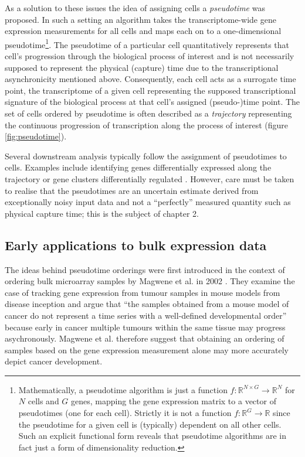 As a solution to these issues the idea of assigning cells a \emph{pseudotime} was proposed. In such a setting an algorithm takes the transcriptome-wide gene expression measurements for all cells and maps each on to a one-dimensional pseudotime\footnote{Mathematically, a pseudotime algorithm is just a function $f: \mathbb{R}^{N\times G} \rightarrow \mathbb{R}^N$ for $N$ cells and $G$ genes, mapping the gene expression matrix to a vector of pseudotimes (one for each cell). Strictly it is not a function $f: \mathbb{R}^G \rightarrow \mathbb{R}$ since the pseudotime for a given cell is (typically) dependent on all other cells. Such an explicit functional form reveals that pseudotime algorithms are in fact just a form of dimensionality reduction.}.
The pseudotime of a particular cell quantitatively represents that cell's progression through the biological process of interest and is not necessarily supposed to represent the physical (capture) time due to the transcriptional asynchronicity mentioned above. Consequently, each cell acts as a surrogate time point, the transcriptome of a given cell representing the supposed transcriptional signature of the biological process at that cell's assigned (pseudo-)time point. The set of cells ordered by pseudotime is often described as a \emph{trajectory} representing the continuous progression of transcription along the process of interest (figure \ref{fig:pseudotime}).

Several downstream analysis typically follow the assignment of pseudotimes to cells. Examples include identifying genes differentially expressed along the trajectory \cite{campbell2016switchde} or gene clusters differentially regulated \cite{Trapnell2014-xi}. However, care must be taken to realise that the pseudotimes are an uncertain estimate derived from exceptionally noisy input data and not a ``perfectly'' measured quantity such as physical capture time; this is the subject of chapter 2.

\subsection{Early applications to bulk expression data}

The ideas behind pseudotime orderings were first introduced in the context of ordering bulk microarray samples by Magwene et al. in 2002 \cite{Magwene2003-bm}. They examine the case of tracking gene expression from tumour samples in mouse models from disease inception and argue that ``the samples obtained from a mouse model of cancer do not represent a time series with a well-defined developmental order''
because early in cancer multiple tumours within the same tissue may progress asychronously. Magwene et al. therefore suggest that obtaining an ordering of samples based on the gene expression measurement alone may more accurately depict cancer development.

